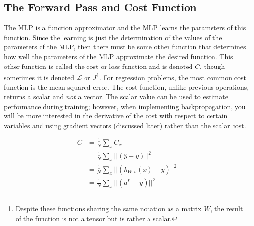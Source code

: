 \documentclass{article}
\begin{document}

\subsection{The Forward Pass and Cost Function}

The MLP is a function approximator and the MLP learns the parameters of
this function. Since the learning is just the determination of the values of the
parameters of the MLP, then there must be some other function that determines
how well the parameters of the MLP approximate the desired function. This other
function is called the cost or loss function and is denoted $C$, though sometimes
it is denoted $\mathcal{L}$ or $J$\footnote{Despite these functions sharing the same notation as
	a matrix $W$, the result of the function is not a tensor but is rather a scalar.}.
For regression problems, the most common
cost function is the mean squared error. The cost function, unlike previous
operations, returns a scalar and \textit{not} a vector. The scalar value can be used to estimate
performance during training; however, when implementing backpropagation, you will
be more interested in the derivative of the cost with respect to certain variables
and using gradient vectors (discussed later) rather than the scalar cost.

\begin{equation}
	\begin{aligned}
		C & = \frac{1}{N} \sum_{x} {C_x}                       \\
		  & = \frac{1}{N} \sum_{x} {||(\hat{y} - y)||^{2} }    \\
		  & = \frac{1}{N} \sum_{x} {||(h_{W,b}(x) - y)||^{2} } \\
		  & = \frac{1}{N} \sum_{x} {||(a^{L} - y)||^{2} }
	\end{aligned}
\end{equation}
\end{document}
